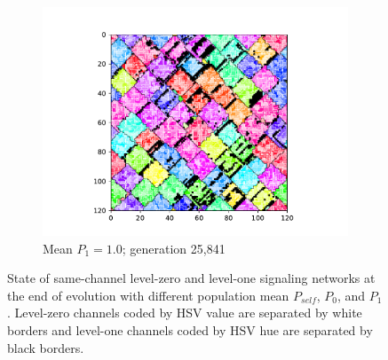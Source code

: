 \begin{figure}[t]
\begin{center}
\begin{subfigure}[b]{0.82\columnwidth}
  \includegraphics[width=\columnwidth,trim={2.5cm 0.5cm 2.5cm 1cm},clip]{img/ChannelMap_1008_update19500000}
  \caption{Mean $P_1 = 1.0$; generation 25,841}
  \label{fig:ChannelMap_1008}
\end{subfigure}

\caption{
State of same-channel level-zero and level-one signaling networks at the end of evolution with different population mean $P_{self}$, $P_0$, and $P_1$.
Level-zero channels coded by HSV value are separated by white borders and level-one channels coded by HSV hue are separated by black borders.
}
\label{fig:outcome_grids}
\end{center}
\end{figure}
